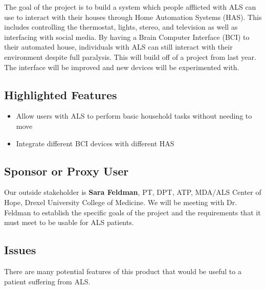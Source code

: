 \documentclass{report}
\begin{document}
The goal of the project is to build a system which people afflicted with ALS
can use to interact with their houses through Home Automation Systems (HAS).
This includes controlling the thermostat, lights, stereo, and television as
well as interfacing with social media. By having a Brain Computer Interface
(BCI) to their automated house, individuals with ALS can still interact with
their environment despite full paralysis. This will build off of a project
from last year. The interface will be improved and new devices will be
experimented with.


\subsection*{Highlighted Features}

\begin{itemize}
\item Allow users with ALS to perform basic household tasks without needing to
    move
\item Integrate different BCI devices with different HAS
\end{itemize}

\subsection*{Sponsor or Proxy User}

Our outside stakeholder is \textbf{Sara Feldman}, PT, DPT, ATP, MDA/ALS Center
of Hope, Drexel University College of Medicine. We will be meeting with Dr.
Feldman to establish the specific goals of the project and the requirements
that it must meet to be usable for ALS patients.

\subsection*{Issues}

There are many potential features of this product that would be useful to a
patient suffering from ALS. 


 
\end{document}
